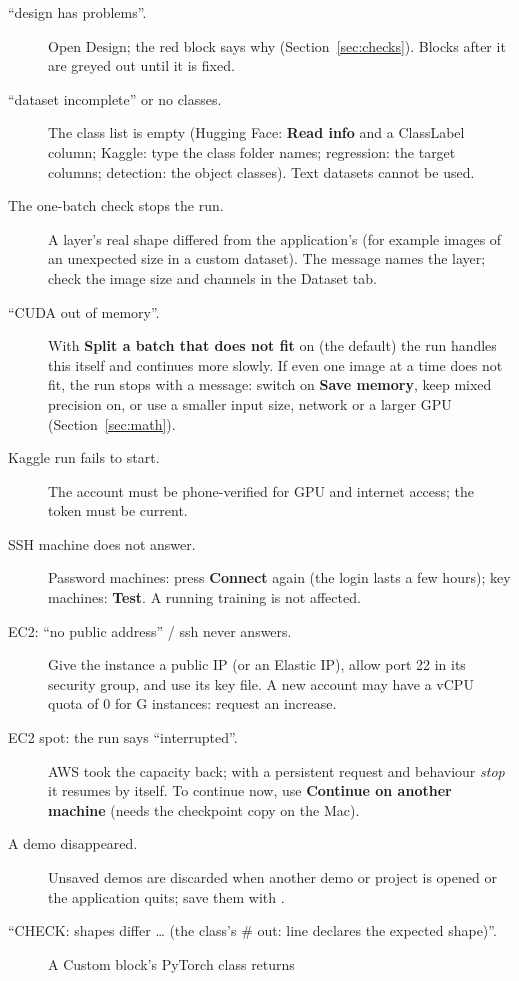 \documentclass[11pt,a4paper]{article}
\newcommand{\ui}[1]{\textbf{\textsf{#1}}}
\newcommand{\kbd}[1]{\mbox{\fboxsep=1.5pt\fbox{\footnotesize\texttt{#1}}}}
\begin{document}
\begin{description}
  \item[``design has problems''.] Open Design; the red block says why (Section~\ref{sec:checks}). Blocks after it are greyed out until it is fixed.
  \item[``dataset incomplete'' or no classes.] The class list is empty (Hugging Face: \ui{Read info} and a ClassLabel column; Kaggle:
        type the class folder names; regression: the target columns; detection: the object classes). Text datasets cannot be used.
  \item[The one-batch check stops the run.] A layer's real shape differed from the application's (for example images of an unexpected
        size in a custom dataset). The message names the layer; check the image size and channels in the Dataset tab.
  \item[``CUDA out of memory''.] With \ui{Split a batch that does not fit} on (the default) the run handles this itself and continues
        more slowly. If even one image at a time does not fit, the run stops with a message: switch on \ui{Save memory}, keep mixed
        precision on, or use a smaller input size, network or a larger GPU (Section~\ref{sec:math}).
  \item[Kaggle run fails to start.] The account must be phone-verified for GPU and internet access; the token must be current.
  \item[SSH machine does not answer.] Password machines: press \ui{Connect} again (the login lasts a few hours); key machines:
        \ui{Test}. A running training is not affected.
  \item[EC2: ``no public address'' / ssh never answers.] Give the instance a public IP (or an Elastic IP), allow port 22 in its security
        group, and use its key file. A new account may have a vCPU quota of 0 for G instances: request an increase.
  \item[EC2 spot: the run says ``interrupted''.] AWS took the capacity back; with a persistent request and behaviour \emph{stop} it resumes
        by itself. To continue now, use \ui{Continue on another machine} (needs the checkpoint copy on the Mac).
  \item[A demo disappeared.] Unsaved demos are discarded when another demo or project is opened or the application quits; save them with
        \kbd{Cmd+S}.
  \item[``CHECK: shapes differ \dots{} (the class's \# out: line declares the expected shape)''.] A Custom block's PyTorch class returns

\end{description}
\end{document}
